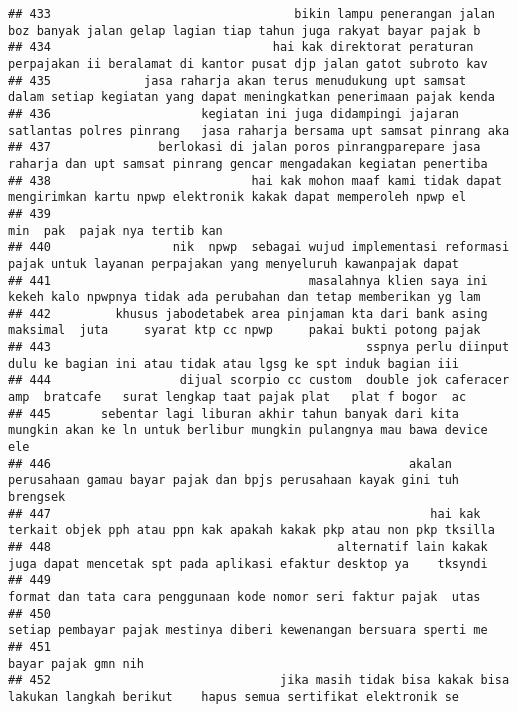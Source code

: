 \documentclass[
]{article}
\begin{document}
\begin{verbatim}
## 433                                  bikin lampu penerangan jalan boz banyak jalan gelap lagian tiap tahun juga rakyat bayar pajak b
## 434                               hai kak direktorat peraturan perpajakan ii beralamat di kantor pusat djp jalan gatot subroto kav  
## 435             jasa raharja akan terus menudukung upt samsat  dalam setiap kegiatan yang dapat meningkatkan penerimaan pajak kenda 
## 436                     kegiatan ini juga didampingi jajaran satlantas polres pinrang   jasa raharja bersama upt samsat pinrang aka 
## 437               berlokasi di jalan poros pinrangparepare jasa raharja dan upt samsat pinrang gencar mengadakan kegiatan penertiba 
## 438                            hai kak mohon maaf kami tidak dapat mengirimkan kartu npwp elektronik kakak dapat memperoleh npwp el 
## 439                                                                                                  min  pak  pajak nya tertib kan 
## 440                 nik  npwp  sebagai wujud implementasi reformasi pajak untuk layanan perpajakan yang menyeluruh kawanpajak dapat 
## 441                                    masalahnya klien saya ini kekeh kalo npwpnya tidak ada perubahan dan tetap memberikan yg lam 
## 442         khusus jabodetabek area pinjaman kta dari bank asing maksimal  juta     syarat ktp cc npwp     pakai bukti potong pajak 
## 443                                            sspnya perlu diinput dulu ke bagian ini atau tidak atau lgsg ke spt induk bagian iii 
## 444                  dijual scorpio cc custom  double jok caferacer amp  bratcafe   surat lengkap taat pajak plat   plat f bogor  ac
## 445       sebentar lagi liburan akhir tahun banyak dari kita mungkin akan ke ln untuk berlibur mungkin pulangnya mau bawa device ele
## 446                                                  akalan perusahaan gamau bayar pajak dan bpjs perusahaan kayak gini tuh brengsek
## 447                                                     hai kak terkait objek pph atau ppn kak apakah kakak pkp atau non pkp tksilla
## 448                                        alternatif lain kakak juga dapat mencetak spt pada aplikasi efaktur desktop ya    tksyndi
## 449                                                              format dan tata cara penggunaan kode nomor seri faktur pajak  utas 
## 450                                                             setiap pembayar pajak mestinya diberi kewenangan bersuara sperti me 
## 451                                                                                                              bayar pajak gmn nih
## 452                                jika masih tidak bisa kakak bisa lakukan langkah berikut    hapus semua sertifikat elektronik se 

\end{verbatim}
\end{document}
